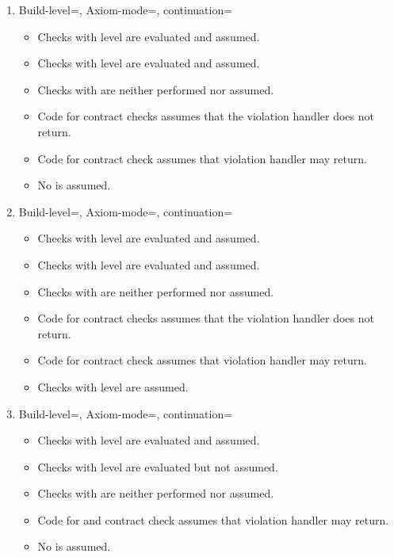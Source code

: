 \begin{enumerate}
\item Build-level=, Axiom-mode=, continuation=
\begin{itemize}
  \item Checks with  level are evaluated and assumed.
  \item Checks with  level are evaluated and assumed.
  \item Checks with  are neither performed nor assumed.
  \item Code for  contract checks 
	  assumes that the violation handler does not return.
  \item Code for  contract check assumes that violation handler
	  may return.
  \item No  is assumed.
\end{itemize}

\item Build-level=, Axiom-mode=, continuation=
\begin{itemize}
  \item Checks with  level are evaluated and assumed.
  \item Checks with  level are evaluated and assumed.
  \item Checks with  are neither performed nor assumed.
  \item Code for  contract checks 
	  assumes that the violation handler does not return.
  \item Code for  contract check assumes that violation handler
	  may return.
  \item Checks with  level are assumed.
\end{itemize}

\item Build-level=, Axiom-mode=, continuation=
\begin{itemize}
  \item Checks with  level are evaluated and assumed.
  \item Checks with  level are evaluated but not assumed.
  \item Checks with  are neither performed nor assumed.
  \item Code for  and  contract check assumes 
	  that violation handler may return.
  \item No  is assumed.
\end{itemize}


\end{enumerate}
